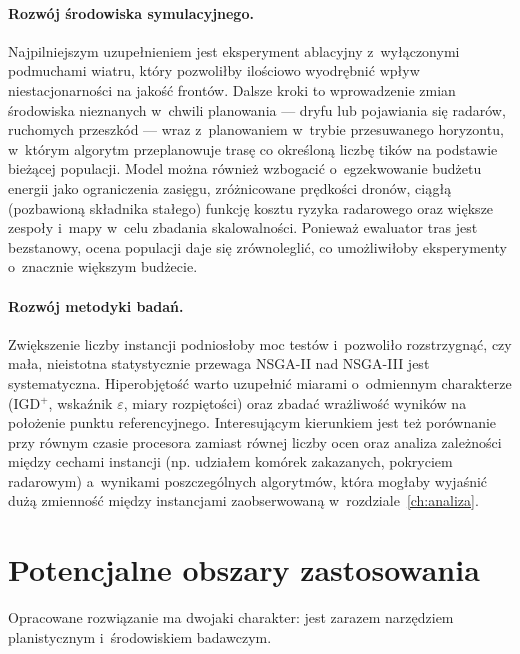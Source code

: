 \paragraph{Rozwój środowiska symulacyjnego.}
Najpilniejszym uzupełnieniem jest eksperyment ablacyjny z~wyłączonymi podmuchami
wiatru, który pozwoliłby ilościowo wyodrębnić wpływ niestacjonarności na jakość
frontów. Dalsze kroki to wprowadzenie zmian środowiska nieznanych w~chwili
planowania --- dryfu lub pojawiania się radarów, ruchomych przeszkód --- wraz
z~planowaniem w~trybie przesuwanego horyzontu, w~którym algorytm przeplanowuje
trasę co określoną liczbę tików na podstawie bieżącej populacji. Model można
również wzbogacić o~egzekwowanie budżetu energii jako ograniczenia zasięgu,
zróżnicowane prędkości dronów, ciągłą (pozbawioną składnika stałego) funkcję
kosztu ryzyka radarowego oraz większe zespoły i~mapy w~celu zbadania
skalowalności. Ponieważ ewaluator tras jest bezstanowy, ocena populacji daje się
zrównoleglić, co umożliwiłoby eksperymenty o~znacznie większym budżecie.

\paragraph{Rozwój metodyki badań.}
Zwiększenie liczby instancji podniosłoby moc testów i~pozwoliło rozstrzygnąć,
czy mała, nieistotna statystycznie przewaga NSGA-II nad NSGA-III jest
systematyczna. Hiperobjętość warto uzupełnić miarami o~odmiennym charakterze
(IGD$^{+}$, wskaźnik $\varepsilon$, miary rozpiętości) oraz zbadać wrażliwość
wyników na położenie punktu referencyjnego. Interesującym kierunkiem jest też
porównanie przy równym czasie procesora zamiast równej liczby ocen oraz analiza
zależności między cechami instancji (np. udziałem komórek zakazanych, pokryciem
radarowym) a~wynikami poszczególnych algorytmów, która mogłaby wyjaśnić dużą
zmienność między instancjami zaobserwowaną w~rozdziale~\ref{ch:analiza}.

\section{Potencjalne obszary zastosowania}
\label{sec:podsumowanie_zastosowania}

Opracowane rozwiązanie ma dwojaki charakter: jest zarazem narzędziem
planistycznym i~środowiskiem badawczym.

